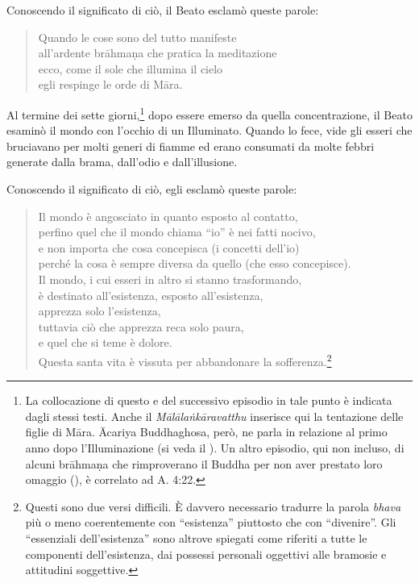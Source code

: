 Conoscendo il significato di ciò, il Beato esclamò queste parole:

\begin{quote}
Quando le cose sono del tutto manifeste \\
all’ardente brāhmaṇa che pratica la meditazione \\
ecco, come il sole che illumina il cielo \\
egli respinge le orde di Māra.
\end{quote}


Al termine dei sette giorni,\footnote{La collocazione di questo e del successivo
  episodio in tale punto è indicata dagli stessi testi. Anche il
  \emph{Mālālaṅkāravatthu} inserisce qui la tentazione delle figlie di Māra.
  Ācariya Buddhaghosa, però, ne parla in relazione al primo anno dopo
  l’Illuminazione (si veda il
  \hyperlink{cap-04-La-diffusione-del-Dhamma#pag70}{}). Un altro episodio, qui
  non incluso, di alcuni brāhmaṇa che rimproverano il Buddha per non aver
  prestato loro omaggio
  (\hyperlink{cap-09-La-fine-del-primo-ventennio#pag137}{}), è correlato ad A.
  4:22.} dopo essere emerso da quella concentrazione, il Beato esaminò il mondo
con l’occhio di un Illuminato. Quando lo fece, vide gli esseri che bruciavano
per molti generi di fiamme ed erano consumati da molte febbri generate dalla
brama, dall’odio e dall’illusione.

Conoscendo il significato di ciò, egli esclamò queste parole:

\begin{quote}
Il mondo è angosciato in quanto esposto al contatto, \\
perfino quel che il mondo chiama “io” è nei fatti nocivo, \\
e non importa che cosa concepisca (i concetti dell’io) \\
perché la cosa è sempre diversa da quello (che esso concepisce). \\
Il mondo, i cui esseri in altro si stanno trasformando, \\
è destinato all’esistenza, esposto all’esistenza, \\
apprezza solo l’esistenza, \\
tuttavia ciò che apprezza reca solo paura, \\
e quel che si teme è dolore. \\
Questa santa vita è vissuta per abbandonare la
sofferenza.\footnote{Questi sono due versi difficili. È davvero necessario tradurre la parola \emph{bhava} più o meno coerentemente con “esistenza” piuttosto che con “divenire”. Gli “essenziali dell’esistenza” sono altrove spiegati come riferiti a tutte le componenti dell’esistenza, dai possessi personali oggettivi alle bramosie e attitudini soggettive.}
\end{quote}

